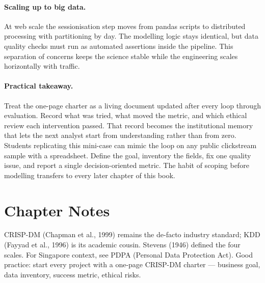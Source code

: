 \paragraph{Scaling up to big data.} At web scale the sessionisation step moves from pandas scripts to distributed processing with partitioning by day.
The modelling logic stays identical, but data quality checks must run as automated assertions inside the pipeline.
This separation of concerns keeps the science stable while the engineering scales horizontally with traffic.
\paragraph{Practical takeaway.} Treat the one-page charter as a living document updated after every loop through evaluation.
Record what was tried, what moved the metric, and which ethical review each intervention passed.
That record becomes the institutional memory that lets the next analyst start from understanding rather than from zero.
Students replicating this mini-case can mimic the loop on any public clickstream sample with a spreadsheet.
Define the goal, inventory the fields, fix one quality issue, and report a single decision-oriented metric.
The habit of scoping before modelling transfers to every later chapter of this book.

\section{Chapter Notes}
CRISP-DM (Chapman et al., 1999) remains the de-facto industry standard; KDD (Fayyad et al., 1996) is its academic cousin. Stevens (1946) defined the four scales. For Singapore context, see PDPA (Personal Data Protection Act). Good practice: start every project with a one-page CRISP-DM charter --- business goal, data inventory, success metric, ethical risks.

